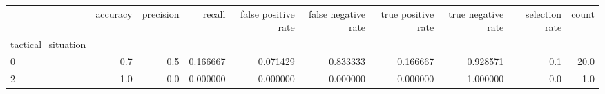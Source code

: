 \begin{tabular}{lrrrrrrrrr}
\toprule
{} &  accuracy &  precision &    recall &  false positive rate &  false negative rate &  true positive rate &  true negative rate &  selection rate &  count \\
tactical\_situation &           &            &           &                      &                      &                     &                     &                 &        \\
\midrule
0                  &       0.7 &        0.5 &  0.166667 &             0.071429 &             0.833333 &            0.166667 &            0.928571 &             0.1 &   20.0 \\
2                  &       1.0 &        0.0 &  0.000000 &             0.000000 &             0.000000 &            0.000000 &            1.000000 &             0.0 &    1.0 \\
\bottomrule
\end{tabular}
